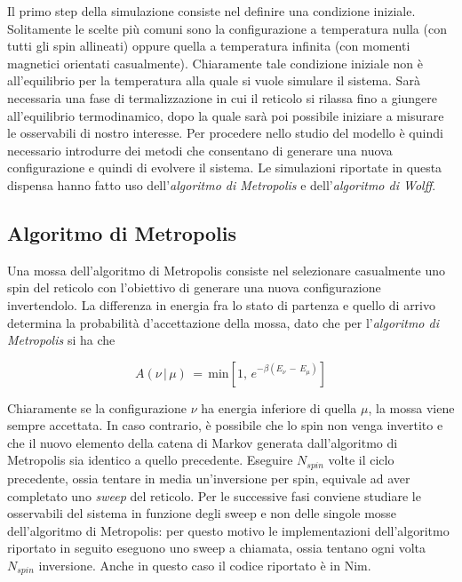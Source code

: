 Il primo step della simulazione consiste nel definire una condizione iniziale. Solitamente le scelte più comuni sono la configurazione 
a temperatura nulla (con tutti gli spin allineati) oppure quella a temperatura infinita (con momenti magnetici orientati casualmente). 
Chiaramente tale condizione iniziale non è all'equilibrio per la temperatura alla quale si vuole simulare il sistema. Sarà necessaria 
una fase di termalizzazione in cui il reticolo si rilassa fino a giungere all'equilibrio termodinamico, dopo la quale sarà poi possibile 
iniziare a misurare le osservabili di nostro interesse. Per procedere nello studio del modello è quindi necessario introdurre dei metodi 
che consentano di generare una nuova configurazione e quindi di evolvere il sistema. Le simulazioni riportate in questa dispensa 
hanno fatto uso dell'\textit{algoritmo di Metropolis} e dell'\textit{algoritmo di Wolff}.





\subsection{Algoritmo di Metropolis}

Una mossa dell'algoritmo di Metropolis consiste nel selezionare casualmente uno spin del reticolo con l'obiettivo di generare una 
nuova configurazione invertendolo. La differenza in energia fra lo stato di partenza e quello di arrivo determina 
la probabilità d'accettazione della mossa, dato che per l'\textit{algoritmo di Metropolis} \cite{M(RT)2} si ha che 

\begin{equation}
    A\left(\nu\,|\,\mu\right)\,=\,\text{min}\left[1,\,e^{-\beta\left(E_{\nu}\,-\,E_{\mu}\right)}\right]
    \label{eq: Metropolis_1D}
\end{equation}

Chiaramente se la configurazione $\nu$ ha energia inferiore di quella $\mu$, la mossa viene sempre accettata. In caso contrario, è 
possibile che lo spin non venga invertito e che il nuovo elemento della catena di Markov generata dall'algoritmo di Metropolis sia identico 
a quello precedente. Eseguire $N_{spin}$ volte il ciclo precedente, ossia tentare in media un'inversione per spin, equivale ad aver 
completato uno \textit{sweep} del reticolo. Per le successive fasi conviene studiare le osservabili del sistema in funzione degli sweep e 
non delle singole mosse dell'algoritmo di Metropolis: per questo motivo le implementazioni dell'algoritmo riportato in seguito 
eseguono uno sweep a chiamata, ossia tentano ogni volta $N_{spin}$ inversione. Anche in questo caso il codice riportato è in Nim.



